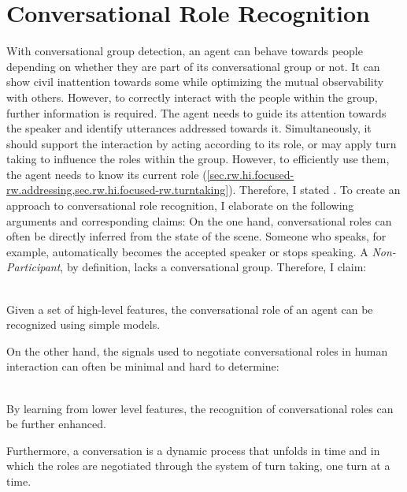\chapter{Conversational Role Recognition}\label{ch.roles}

With \gls{conversational group} detection, an agent can behave towards people depending on whether they are part of its \gls{conversational group} or not.
It can show \gls{civil inattention} towards some while optimizing the mutual observability with others.
However, to correctly interact with the people within the group, further information is required.
The agent needs to guide its attention towards the \gls{speaker} and identify utterances addressed towards it. 
Simultaneously, it should support the interaction by acting according to its role, or may apply \gls{turn taking} to influence the roles within the group.
However, to efficiently use them, the agent needs to know its current role (\cref{sec.rw.hi.focused-rw.addressing,sec.rw.hi.focused-rw.turntaking}). 
Therefore, I stated .
To create an approach to \gls{conversational role} recognition, I elaborate on the following arguments and corresponding claims:
On the one hand, \glspl{conversational role} can often be directly inferred from the state of the scene.
Someone who speaks, for example, automatically becomes the accepted \gls{speaker} or stops speaking.
A \emph{Non-Participant}, by definition, lacks a \gls{conversational group}.
Therefore, I claim:
\newcommand{\hyprolerule}{Given a set of high-level features, the \gls{conversational role} of an agent can be recognized using simple models.}
\begin{hyp3}
    \label{role.rule}
    \hspace{0pt}\\
    \hyprolerule
\end{hyp3}
On the other hand, the signals used to negotiate \glspl{conversational role} in human interaction can often be minimal and hard to determine:
\newcommand{\hyproleraw}{By learning from lower level features, the recognition of \glspl{conversational role} can be further enhanced.}
\begin{hyp3}
    \label{role.raw}
    \hspace{0pt}\\
    \hyproleraw
\end{hyp3}
Furthermore, a \gls{conversation} is a dynamic process that unfolds in time and in which the roles are negotiated through the system of \gls{turn} taking, one \gls{turn} at a time.
